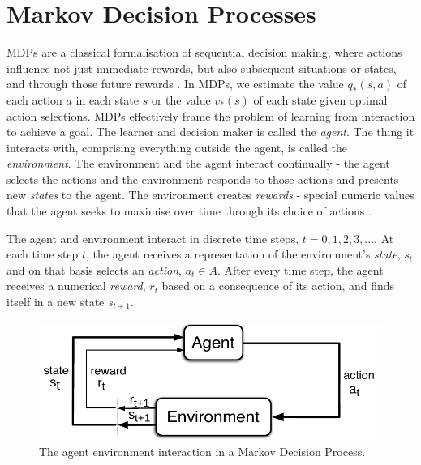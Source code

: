 \section{Markov Decision Processes}

MDPs are a classical formalisation of sequential decision making, where actions influence not just immediate rewards, but also subsequent situations or states, and through those future rewards \cite{sutton2018reinforcement}. In MDPs, we estimate the value $q_*(s,a)$ of each action $a$ in each state $s$ or the value $v_*(s)$ of each state given optimal action selections. MDPs effectively frame the problem of learning from interaction to achieve a goal. The learner and decision maker is called the \textit{agent}. The thing it interacts with, comprising everything outside the agent, is called the \textit{environment}. The environment and the agent interact continually - the agent selects the actions and the environment responds to those actions and presents new \textit{states} to the agent. The environment creates \textit{rewards} - special numeric values that the agent seeks to maximise over time through its choice of actions \cite{sutton2018reinforcement}. 

The agent and environment interact in discrete time steps, $t = 0,1,2,3, ...$. At each time step $t$, the agent receives a representation of the environment's \textit{state}, $s_t$ and on that basis selects an \textit{action}, $a_t \in A$. After every time step, the agent receives a numerical \textit{reward}, $r_t$ based on a consequence of its action, and finds itself in a new state $s_{t+1}$. 

\begin{figure}[h]
  \centering
  \includegraphics[width=\linewidth]{figures/mdp_ag_env_interaction.png}
  \caption{The agent environment interaction in a Markov Decision Process.}
\end{figure}


